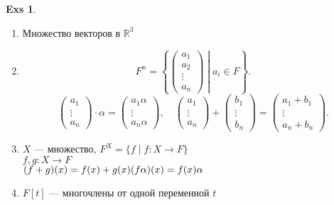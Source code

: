\documentclass[11pt]{book}
\newcommand{\R}{\mathbb{R}}
\theoremstyle{definition}
\theoremstyle{plain}
\theoremstyle{plain}
\theoremstyle{definition}
\newtheorem*{exs}{Exs}
\theoremstyle{remark}
\begin{document}
\begin{exs}
    $ $
\begin{enumerate}
    \item Множество векторов в $\R ^3$
    \item \[
	 F^{n} = \left\{ 
	 \begin{pmatrix}
	     a_1 \\ a_2 \\ \vdots \\ a_{n}
	 \end{pmatrix}
    \middle| a_i \in  F 
     \right\} 
	 .\] 
	 \[
	 \begin{pmatrix}
	     a_1 \\ \vdots \\ a_n
	 \end{pmatrix}
	 \cdot \alpha  = 
	 \begin{pmatrix}
	     a_1\alpha \\ \vdots \\ a_n \alpha
	 \end{pmatrix}
	 , \quad 
	     \begin{pmatrix}
	         a_1 \\ \vdots \\ a_n
	     \end{pmatrix}
	     + 
	     \begin{pmatrix}
	         b_1 \\ \vdots \\ b_n
	     \end{pmatrix}
	      =
	      \begin{pmatrix}
	          a_1 + b_1 \\ \vdots \\ a_n + b_n
	      \end{pmatrix}
	 .\] 
    \item $X$ --- множество, $F^X = \{f \mid f:X \to F\}$ \\
	$f, g: X \to F$\\
	$(f+g)(x) = f(x) + g(x)\\ (f \alpha) (x) = f(x)\alpha$
    \item $F[t]$ --- многочлены от одной переменной $t$
\end{enumerate}
\end{exs}
\end{document}
